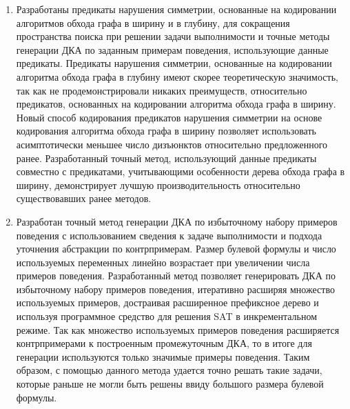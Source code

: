 \begin{enumerate}
  \item Разработаны предикаты нарушения симметрии, основанные на кодировании алгоритмов обхода графа в ширину и в глубину, для сокращения пространства поиска при решении задачи выполнимости и точные методы генерации ДКА по заданным примерам поведения, использующие данные предикаты. 
  Предикаты нарушения симметрии, основанные на кодировании алгоритма обхода графа в глубину имеют скорее теоретическую значимость, так как не продемонстрировали никаких преимуществ, относительно предикатов, основанных на кодировании алгоритма обхода графа в ширину.
  Новый способ кодирования предикатов нарушения симметрии на основе кодирования алгоритма обхода графа в ширину позволяет использовать асимптотически меньшее число дизъюнктов относительно предложенного ранее.
  Разработанный точный метод, использующий данные предикаты совместно с предикатами, учитывающими особенности дерева обхода графа в ширину, демонстрирует лучшую производительность относительно существовавших ранее методов.

  \item Разработан точный метод генерации ДКА по избыточному набору примеров поведения с использованием сведения к задаче выполнимости и подхода уточнения абстракции по контрпримерам.
  Размер булевой формулы и число используемых переменных линейно возрастает при увеличении числа примеров поведения.
  Разработанный метод позволяет генерировать ДКА по избыточному набору примеров поведения, итеративно расширяя множество используемых примеров, достраивая расширенное префиксное дерево и используя программное средство для решения SAT в инкрементальном режиме.
  Так как множество используемых примеров поведения расширяется контрпримерами к построенным промежуточным ДКА, то в итоге для генерации используются только значимые примеры поведения.
  Таким образом, с помощью данного метода удается точно решать такие задачи, которые раньше не могли быть решены ввиду большого размера булевой формулы.


\end{enumerate}
